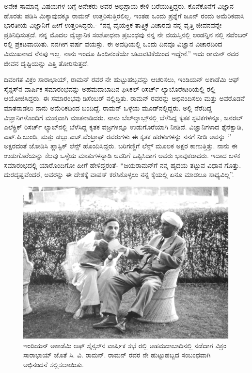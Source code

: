 ಅನೇಕ ಸಾಮಾನ್ಯ ವಿಷಯಗಳ ಬಗ್ಗೆ ಅನೇಕರು ಅವರ ಅಭಿಪ್ರಾಯ ಕೇಳಿ ಬರೆಯುತ್ತಿದ್ದರು. ಕೊನೆಕೊನೆಗೆ ವಿಜ್ಞಾನ ಹೊರತು ಪಡಿಸಿ ಮಿಕ್ಕಾವುದಕ್ಕೂ ರಾಮನ್ ಉತ್ತರಿಸುತ್ತಿರಲಿಲ್ಲ. ಇಂತಹ ಒಂದು ಪ್ರಶ್ನೆಗೆ ಜೂನ್  ರಂದು ಅಮೆರಿಕವಾಸಿ ಭಾರತೀಯ ವಿಜ್ಞಾನಿಗೆ ಹೀಗೆ ಉತ್ತರಿಸಿದ್ದರು.- “ನನ್ನ ವೈಯಕ್ತಿಕ ತಾತ್ತ್ವಿಕ ವಿಚಾರವು ನನ್ನ ವೃತ್ತಿ ಜೀವನವನ್ನೇ ಪ್ರತಿನಿಧಿಸುತ್ತದೆ. ನನ್ನ ಮೊದಲ ವೈಜ್ಞಾನಿಕ ಸಂಶೋಧನಾ ಪ್ರಬಂಧವು ನನ್ನ ನೇ ವಯಸ್ಸಿನಲ್ಲಿ ಲಂಡನ್ನಿನ \textit{} ನಲ್ಲಿ ನವೆಂಬರ್ ರಲ್ಲಿ ಪ್ರಕಟವಾಯಿತು. ನನಗೀಗ  ವರ್ಷ ವಯಸ್ಸು. ಈ ಅವಧಿಯಲ್ಲಿ ಒಂದು ದಿನವೂ ವಿಜ್ಞಾನ ವಿಚಾರದಿಂದ ವಿಮುಖನಾದ ನೆನಪು ಇಲ್ಲ. ನಾನು ಇಂದೂ ಹಿಂದಿನಂತೆಯೇ ಚಟುವಟಿಕೆಯಿಂದ ಇದ್ದೇನೆ.” ಇದು ರಾಮನ್ ರವರ ಜೀವನ ದೃಷ್ಟಿಯನ್ನು ಎತ್ತಿ ತೋರಿಸುತ್ತದೆ.

ದಿವಂಗತ ವಿಕ್ರಂ ಸಾರಾಭಾಯ್, ರಾಮನ್ ರವರ ನೇ ಹುಟ್ಟುಹಬ್ಬವನ್ನು ಆಚರಿಸಲು, ಇಂಡಿಯನ್ ಅಕಾಡೆಮಿ ಆಫ್ ಸೈನ್ಸಸ್‍ನ ವಾರ್ಷಿಕ ಸಮಾರಂಭವನ್ನು ಅಹಮದಾಬಾದಿನ ಫಿಸಿಕಲ್ ರಿಸರ್ಚ್ ಲ್ಯಾಬೊರೇಟರಿಯಲ್ಲಿ ರಲ್ಲಿ ಆಯೋಜಿಸಿದ್ದರು. ಈ ಸಮಾರಂಭವು ಡಿಸೆಂಬರ್ ನಲ್ಲಿದ್ದಿತು. ರಾಮನ್ ರವರನ್ನು ಅಭಿನಂದಿಸಲು ಮತ್ತು ಅವರೊಡನೆ ಮಾತನಾಡಲು ನಾನು ಅಮೆರಿಕದಿಂದ ಬಂದಿದ್ದೆ. ರಾಮನ್ ಒಳ್ಳೆಯ ಮೂಡ್‍ನಲ್ಲಿದ್ದರು. ಅಲ್ಲಿ ನೆರೆದಿದ್ದ ವಿಜ್ಞಾನಿಗಳೊಂದಿಗೆ ಮುಕ್ತವಾಗಿ ಮಾತನಾಡಿದರು. ನಾನು ಬೆಲ್‍ಲ್ಯಾಬ್ಸ್‌ನಲ್ಲಿ ಬೆಳೆಸಿದ್ದ ಕೃತಕ ಸ್ಫಟಿಕಗಳನ್ನೂ, ಜನರಲ್ ಎಲೆಕ್ಟ್ರಿಕ್ ರಿಸರ್ಚ್ ಲ್ಯಾಬ್‍ನಲ್ಲಿ ಬೆಳೆಸಿದ್ದ ಕೃತಕ ವಜ್ರಗಳನ್ನೂ ಉಡುಗೊರೆಯಾಗಿ ನೀಡಿದೆ. ವಿಜ್ಞಾನಿಗಳಾದ ಶ್ನೆನೆಕ್ವಾಡಿ, ಎಪ್.ಪಿ.ಬುಂಡಿ, ಮತ್ತು ಡಬ್ಲು.ಎಚ್.ವೆಂಟ್ರಾಫ್ ರವರುಗಳು ಈ ಕೃತಕ ಹರಳುಗಳನ್ನು ನನಗೆ ನೀಡಿ ಅವನ್ನು ‘’ ಅಕ್ಷರದಂತೆ ಜೋಡಿಸಿ ಪ್ಲಾಸ್ಟಿಕ್ ಲೆನ್ಸ್ ಹೊಂದಿಸಿದ್ದರು. ಬರಿಗಣ್ಣಿಗೆ ಲೆನ್ಸ್ ಮೂಲಕ ಅಕ್ಷರ ಕಾಣುತ್ತಿತ್ತು. ನಾನು ಈ ಉಡುಗೊರೆಯನ್ನು ಕೆಲವು ಒಳ್ಳೆಯ ಮಾತುಗಳನ್ನಾಡಿ ಅವರಿಗೆ ಒಪ್ಪಿಸಿದಾಗ ಅವರು ಭಾವುಕರಾದರು. ಇದಾದ ಬಳಿಕ ಸಮಾರಂಭದಲ್ಲಿ ಯಾರೊಂದಿಗೋ ಹೀಗೆ ಹೇಳಿದ್ದರಂತೆ- “ಜಯರಾಮನ್‍ಗೆ ನನ್ನ ಹೃದಯ ತಟ್ಟುವ ವಿಧಾನ ಗೊತ್ತು. ದುರದೃಷ್ಟವೆಂದರೆ, ಅವರನ್ನು ಈ ದೇಶಕ್ಕೆ ವಾಪಸ್ ಕರೆಸಿಕೊಳ್ಳಲು ನನ್ನ ಕೈಯಲ್ಲಿ ಏನೂ ಮಾಡಲೂ ಸಾಧ್ಯವಿಲ್ಲ”.

\begin{figure}
\includegraphics{"images/11.jpg"}
\caption{ಇಂಡಿಯನ್ ಅಕಾಡೆಮಿ ಆಫ್ ಸೈನ್ಸಸ್‍ನ ವಾರ್ಷಿಕ ಸಭೆ ರಲ್ಲಿ ಅಹಮದಾಬಾದಿನಲ್ಲಿ ನಡೆದಾಗ ವಿಕ್ರಂ ಸಾರಾಭಾಯ್ ಜೊತೆ ಸಿ. ವಿ. ರಾಮನ್. ರಾಮನ್ ರವರ ನೇ ಹುಟ್ಟುಹಬ್ಬದ ಸಂಬಂಧವಾಗಿ ಅಭಿನಂದನೆ ಸಲ್ಲಿಸಲಾಯಿತು.}
\end{figure}

